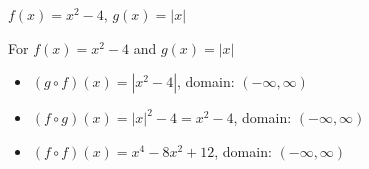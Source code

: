{$f(x) = x^2-4$, $g(x) = |x|$}
{For  $f(x) = x^2-4$ and $g(x) = |x|$ 

\begin{itemize}

\item  $(g \circ f)(x) = |x^2-4|$, domain: $(-\infty, \infty)$

\item  $(f \circ g)(x) =|x|^2-4 = x^2-4$, domain: $(-\infty, \infty)$

\item  $(f \circ f)(x) =x^4-8x^2+12$, domain: $(-\infty, \infty)$

\end{itemize}
}